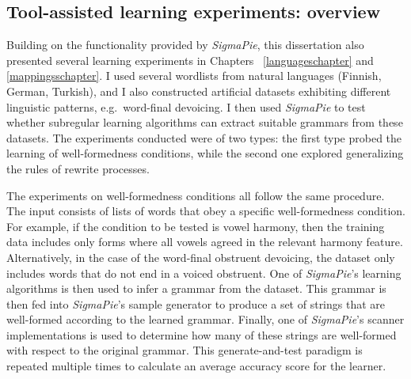 \subsection{Tool-assisted learning experiments: overview}

Building on the functionality provided by \emph{SigmaPie}, this dissertation also presented several learning experiments in Chapters~ \ref{languageschapter} and \ref{mappingsschapter}.
I used several wordlists from natural languages (Finnish, German, Turkish), and I also constructed artificial datasets exhibiting different linguistic patterns, e.g.\ word-final devoicing.
I then used \emph{SigmaPie} to test whether subregular learning algorithms can extract suitable grammars from these datasets.
The experiments conducted were of two types: the first type probed the learning of well-formedness conditions, while the second one explored generalizing the rules of rewrite processes.

The experiments on well-formedness conditions all follow the same procedure.
The input consists of lists of words that obey a specific well-formedness condition.
For example, if the condition to be tested is vowel harmony, then the training data includes only forms where all vowels agreed in the relevant harmony feature.
Alternatively, in the case of the word-final obstruent devoicing, the dataset only includes words that do not end in a voiced obstruent.
One of \emph{SigmaPie}'s learning algorithms is then used to infer a grammar from the dataset.
This grammar is then fed into \emph{SigmaPie}'s sample generator to produce a set of strings that are well-formed according to the learned grammar.
Finally, one of \emph{SigmaPie}'s scanner implementations is used to determine how many of these strings are well-formed with respect to the original grammar.
This generate-and-test paradigm is repeated multiple times to calculate an average accuracy score for the learner.


